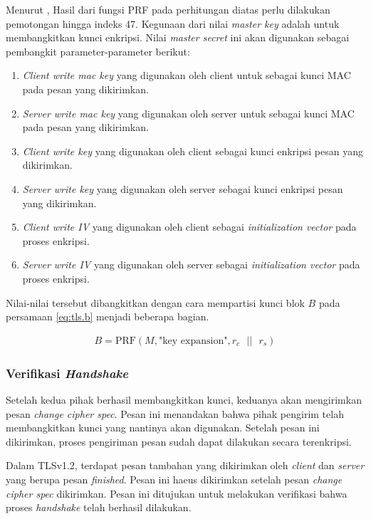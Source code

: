 Menurut \textcite{rfc5246}, Hasil dari fungsi PRF pada perhitungan diatas perlu dilakukan pemotongan hingga indeks 47. Kegunaan dari nilai \emph{master key} adalah untuk membangkitkan kunci enkripsi. Nilai \emph{master secret} ini akan digunakan sebagai pembangkit parameter-parameter berikut:

\begin{enumerate}
  \item \emph{Client write mac key} yang digunakan oleh client untuk sebagai kunci MAC pada pesan yang dikirimkan.
  \item \emph{Server write mac key} yang digunakan oleh server untuk sebagai kunci MAC pada pesan yang dikirimkan.
  \item \emph{Client write key} yang digunakan oleh client sebagai kunci enkripsi pesan yang dikirimkan.
  \item \emph{Server write key} yang digunakan oleh server sebagai kunci enkripsi pesan yang dikirimkan.
  \item \emph{Client write IV} yang digunakan oleh client sebagai \emph{initialization vector} pada proses enkripsi.
  \item \emph{Server write IV} yang digunakan oleh server sebagai \emph{initialization vector} pada proses enkripsi.
\end{enumerate}

Nilai-nilai tersebut dibangkitkan dengan cara mempartisi kunci blok $B$ pada persamaan \ref{eq:tls.b} menjadi beberapa bagian.

\begin{equation}
  \label{eq:tls.b}
  \begin{array}{l}
    B = \text{PRF}(M, \text{"key expansion"}, r_c \text{ }||\text{ }r_s)
  \end{array}
\end{equation}

\subsubsection{Verifikasi \emph{Handshake}}
Setelah kedua pihak berhasil membangkitkan kunci, keduanya akan mengirimkan pesan \emph{change cipher spec}. Pesan ini menandakan bahwa pihak pengirim telah membangkitkan kunci yang nantinya akan digunakan. Setelah pesan ini dikirimkan, proses pengiriman pesan sudah dapat dilakukan secara terenkripsi. 

Dalam TLSv1.2, terdapat pesan tambahan yang dikirimkan oleh \emph{client} dan \emph{server} yang berupa pesan \emph{finished}. Pesan ini haeus dikirimkan setelah pesan \emph{change cipher spec} dikirimkan. Pesan ini ditujukan untuk melakukan verifikasi bahwa proses \emph{handshake} telah berhasil dilakukan.

